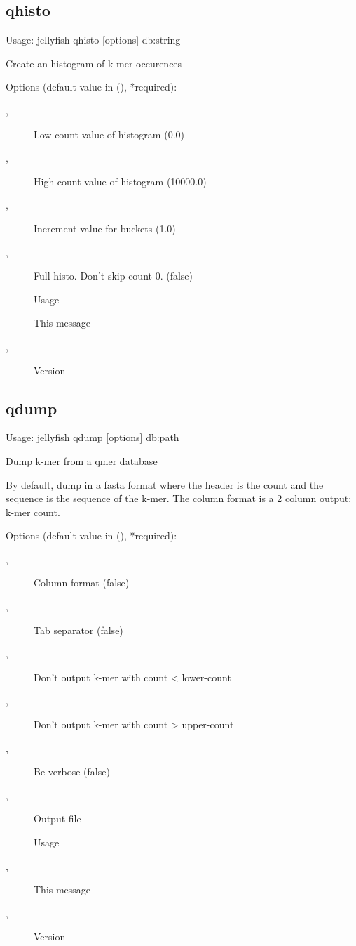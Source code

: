 \subsection{qhisto}
\noindent Usage: jellyfish qhisto [options] db:string

\noindent Create an histogram of k-mer occurences

\noindent Options (default value in (), *required):
\begin{description}
\item[,] \noindent Low count value of histogram (0.0)
\item[,] \noindent High count value of histogram (10000.0)
\item[,] \noindent Increment value for buckets (1.0)
\item[,] \noindent Full histo. Don't skip count 0. (false)
\item[] \noindent Usage
\item[] \noindent This message
\item[,] \noindent Version
\end{description}

\subsection{qdump}
\noindent Usage: jellyfish qdump [options] db:path

\noindent Dump k-mer from a qmer database

\noindent By default, dump in a fasta format where the header is the count and
\noindent the sequence is the sequence of the k-mer. The column format is a 2
\noindent column output: k-mer count.

\noindent Options (default value in (), *required):
\begin{description}
\item[,] \noindent Column format (false)
\item[,] \noindent Tab separator (false)
\item[,] \noindent Don't output k-mer with count < lower-count
\item[,] \noindent Don't output k-mer with count > upper-count
\item[,] \noindent Be verbose (false)
\item[,] \noindent Output file
\item[] \noindent Usage
\item[,] \noindent This message
\item[,] \noindent Version
\end{description}

